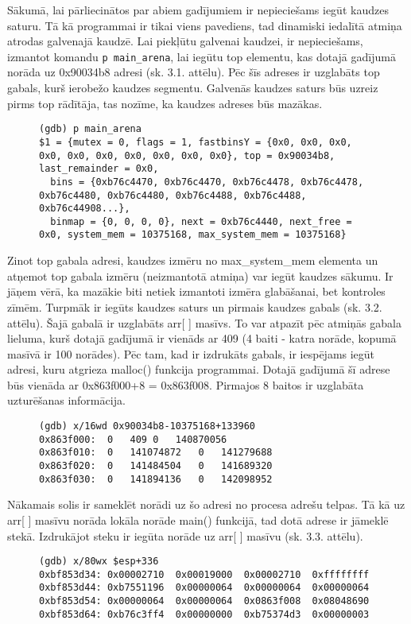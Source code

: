 Sākumā, lai pārliecinātos par abiem gadījumiem ir nepieciešams iegūt kaudzes saturu.
Tā kā programmai ir tikai viens pavediens, tad dinamiski iedalītā atmiņa atrodas galvenajā kaudzē.
Lai piekļūtu galvenai kaudzei, ir nepieciešams, izmantot komandu \texttt{p main\_arena}, lai iegūtu top elementu, kas dotajā gadījumā norāda uz 0x90034b8 adresi (sk. 3.1. attēlu). 
Pēc šīs adreses ir uzglabāts top gabals, kurš ierobežo kaudzes segmentu.
Galvenās kaudzes saturs būs uzreiz pirms top rādītāja, tas nozīme, ka kaudzes adreses būs mazākas.
\begin{figure}[h]
\begin{lstlisting}[style=customgdb]
(gdb) p main_arena
$1 = {mutex = 0, flags = 1, fastbinsY = {0x0, 0x0, 0x0, 0x0, 0x0, 0x0, 0x0, 0x0, 0x0, 0x0}, top = 0x90034b8, last_remainder = 0x0, 
  bins = {0xb76c4470, 0xb76c4470, 0xb76c4478, 0xb76c4478, 0xb76c4480, 0xb76c4480, 0xb76c4488, 0xb76c4488, 0xb76c44908...}, 
  binmap = {0, 0, 0, 0}, next = 0xb76c4440, next_free = 0x0, system_mem = 10375168, max_system_mem = 10375168}
\end{lstlisting}
\caption{\textbf{\fontsize{11}{12}\selectfont {Galvenā arēna}}}
\end{figure}
Zinot top gabala adresi, kaudzes izmēru no max\_system\_mem elementa un atņemot top gabala izmēru (neizmantotā atmiņa) var iegūt kaudzes sākumu.
Ir jāņem vērā, ka mazākie biti netiek izmantoti izmēra glabāšanai, bet kontroles zīmēm.
Turpmāk ir iegūts kaudzes saturs un pirmais kaudzes gabals (sk. 3.2. attēlu).
Šajā gabalā ir uzglabāts arr[ ] masīvs. To var atpazīt pēc atmiņās gabala lieluma, kurš dotajā gadījumā ir vienāds ar 409 (4 baiti - katra norāde, kopumā masīvā ir 100 norādes).
Pēc tam, kad ir izdrukāts gabals, ir iespējams iegūt adresi, kuru atgrieza malloc() funkcija programmai.
Dotajā gadījumā šī adrese būs vienāda ar 0x863f000+8 = 0x863f008.
Pirmajos 8 baitos ir uzglabāta uzturēšanas informācija.
\begin{figure}[h]
\begin{lstlisting}[style=customgdb]
(gdb) x/16wd 0x90034b8-10375168+133960
0x863f000:	0	409	0	140870056
0x863f010:	0	141074872	0	141279688
0x863f020:	0	141484504	0	141689320
0x863f030:	0	141894136	0	142098952
\end{lstlisting}
\caption{\textbf{\fontsize{11}{12}\selectfont {Pirmais gabals kaudzē}}}
\end{figure}
Nākamais solis ir sameklēt norādi uz šo adresi no procesa adrešu telpas.
Tā kā uz arr[ ] masīvu norāda lokāla norāde main() funkcijā, tad dotā adrese ir jāmeklē stekā.
Izdrukājot steku ir iegūta norāde uz arr[ ] masīvu (sk. 3.3. attēlu).
\begin{figure}[h]
\begin{lstlisting}[style=customgdb]
(gdb) x/80wx $esp+336
0xbf853d34:	0x00002710	0x00019000	0x00002710	0xffffffff
0xbf853d44:	0xb7551196	0x00000064	0x00000064	0x00000064
0xbf853d54:	0x00000064	0x00000064	0x0863f008	0x08048690
0xbf853d64:	0xb76c3ff4	0x00000000	0xb75374d3	0x00000003
\end{lstlisting}
\caption{\textbf{\fontsize{11}{12}\selectfont {Steka satura iztrūka}}}
\end{figure}

